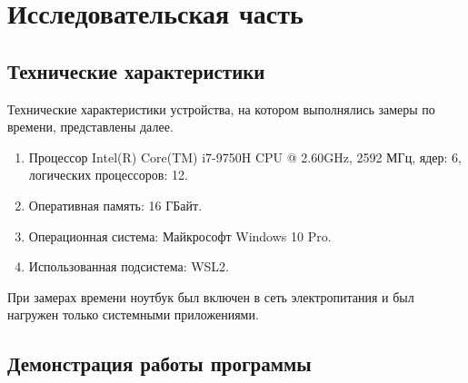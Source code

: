 \chapter{Исследовательская часть}

\section{Технические характеристики}

Технические характеристики устройства, на котором выполнялись замеры по времени, представлены далее.

\begin{enumerate}
	\item Процессор	Intel(R) Core(TM) i7-9750H CPU @ 2.60GHz, 2592 МГц, ядер: 6, логических процессоров: 12.
	\item Оперативная память: 16 ГБайт.
	\item Операционная система: Майкрософт Windows 10 Pro. \cite{windows}
	\item Использованная подсистема: WSL2. \cite{WSL2}
\end{enumerate}

При замерах времени ноутбук был включен в сеть электропитания и был нагружен только системными приложениями.

\section{Демонстрация работы программы}

